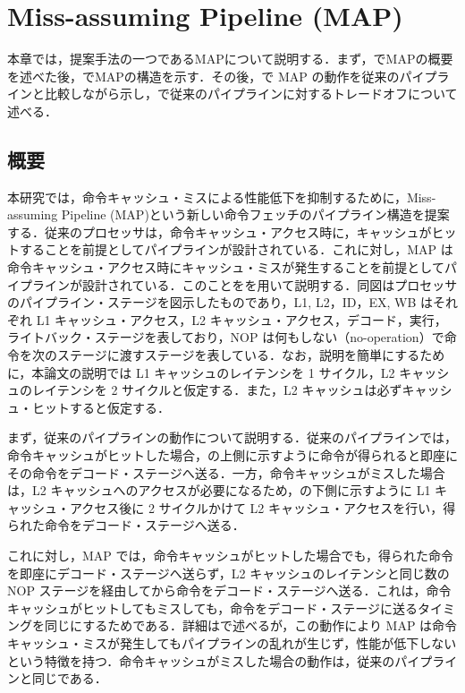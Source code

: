 
\chapter{Miss-assuming Pipeline (MAP)}
\label{sec:miss_assumed_pipeline}
本章では，提案手法の一つであるMAPについて説明する．まず，でMAPの概要を述べた後，でMAPの構造を示す．その後，で MAP の動作を従来のパイプラインと比較しながら示し，で従来のパイプラインに対するトレードオフについて述べる．

\section{概要}
\label{sec:map_abstract}

本研究では，命令キャッシュ・ミスによる性能低下を抑制するために，Miss-assuming Pipeline (MAP)という新しい命令フェッチのパイプライン構造を提案する．従来のプロセッサは，命令キャッシュ・アクセス時に，キャッシュがヒットすることを前提としてパイプラインが設計されている．これに対し，MAP は命令キャッシュ・アクセス時にキャッシュ・ミスが発生することを前提としてパイプラインが設計されている．このことをを用いて説明する．同図はプロセッサのパイプライン・ステージを図示したものであり，L1, L2，ID，EX, WB はそれぞれ L1 キャッシュ・アクセス，L2 キャッシュ・アクセス，デコード，実行，ライトバック・ステージを表しており，NOP は何もしない（no-operation）で命令を次のステージに渡すステージを表している．なお，説明を簡単にするために，本論文の説明では L1 キャッシュのレイテンシを 1 サイクル，L2 キャッシュのレイテンシを 2 サイクルと仮定する．また，L2 キャッシュは必ずキャッシュ・ヒットすると仮定する．

まず，従来のパイプラインの動作について説明する．従来のパイプラインでは，命令キャッシュがヒットした場合，の上側に示すように命令が得られると即座にその命令をデコード・ステージへ送る．一方，命令キャッシュがミスした場合は，L2 キャッシュへのアクセスが必要になるため，の下側に示すように L1 キャッシュ・アクセス後に 2 サイクルかけて L2 キャッシュ・アクセスを行い，得られた命令をデコード・ステージへ送る．

これに対し，MAP では，命令キャッシュがヒットした場合でも，得られた命令を即座にデコード・ステージへ送らず，L2 キャッシュのレイテンシと同じ数の NOP ステージを経由してから命令をデコード・ステージへ送る．これは，命令キャッシュがヒットしてもミスしても，命令をデコード・ステージに送るタイミングを同じにするためである．詳細はで述べるが，この動作により MAP は命令キャッシュ・ミスが発生してもパイプラインの乱れが生じず，性能が低下しないという特徴を持つ．命令キャッシュがミスした場合の動作は，従来のパイプラインと同じである．

